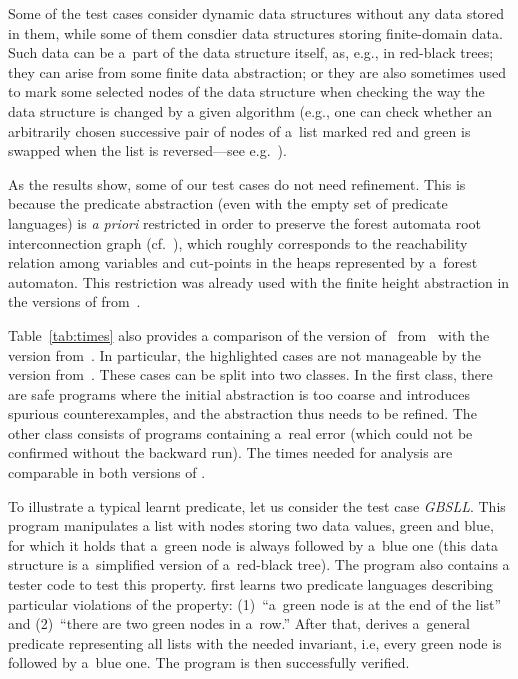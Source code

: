 {Some of the test cases consider dynamic data structures without any data stored
in them, while some of them consdier data structures storing finite-domain data.
Such data can
be a~part of the data structure itself, as, e.g., in red-black trees; they can
arise from some finite data abstraction; or they are also sometimes used to
mark some selected nodes of the data structure when checking the way the data
structure is changed by a given algorithm (e.g., one can check whether an
arbitrarily chosen successive pair of nodes of a~list marked red and green is
swapped when the list is reversed---see e.g.~\cite{artmc}).

As the results show, some of our test cases do not need refinement.
This is because the predicate abstraction (even with the empty set of predicate
languages) is \emph{a priori} restricted in order to preserve the forest automata root interconnection graph (cf.\ ),
which roughly corresponds to the reachability relation among variables and
cut-points in the heaps represented by a~forest automaton.
This restriction was already used with the
finite height abstraction in the versions of \forester
from~\cite{habermehl:forest,boxes13}.

Table~\ref{tab:times} also provides a comparison of the version of~\forester
from~\cite{boxes13} with the version from~\cite{vmcai17}.
In particular, the highlighted cases are not manageable by the version from~\cite{boxes13}.
These cases can be split into two classes.
In the first class, there are safe programs where the initial abstraction is too
coarse and introduces spurious counterexamples, and the abstraction thus needs
to be refined.
The other class consists of programs 
containing a~real error (which could not be confirmed without the backward run).
The times needed for analysis are comparable in both versions of \forester.

To illustrate a typical learnt predicate, let us consider the test case \mbox{\emph{GBSLL}}.
This program manipulates a list with nodes storing two data values, green and blue, for which it holds
that a~green node is always followed by a~blue one (this data structure is
a~simplified version of a~red-black tree).
The program also contains a tester code to test this property.
\forester{} first learns two predicate languages describing particular violations of the property:
(1)~``a~green node is at the end of the list'' and
(2)~``there are two green nodes in a~row.''
After that, \forester{} derives a~general predicate representing all lists with
the needed invariant, i.e, every green node is followed by a~blue one.
The program is then successfully verified. 

}
